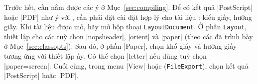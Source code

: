 Trước hết, cần nắm được các ý ở Mục~\vref{sec:compiling}.
Để có kết quả |PostScript| hoặc |PDF| như ý với \LyX, cần phải
đặt cài đặt hợp lý cho tài liệu \LyX{}: kiểu giấy, hướng giấy.
Khi tài liệu \LyX{} được mở, hãy mở hộp thoại \texttt{Layout\LyXarrow Document}.
Ở phần \texttt{Layout}, thiết lập cho các tuỳ chọn |nopsheader|, |orient| và |paper|
(theo các đã trình bày ở Mục~\ref{sec:classopts}). Sau đó, ở phần |Paper|,
chọn khổ giấy và hướng giấy tương ứng với thiết lập ấy. Có thể chọn
|letter| nếu dùng tuỳ chọn |paper=screen|. Cuối cùng, trong menu |View|
hoặc (\texttt{File\LyXarrow Export}), chọn kết quả |PostScript| hoặc |PDF|.

\endinput
